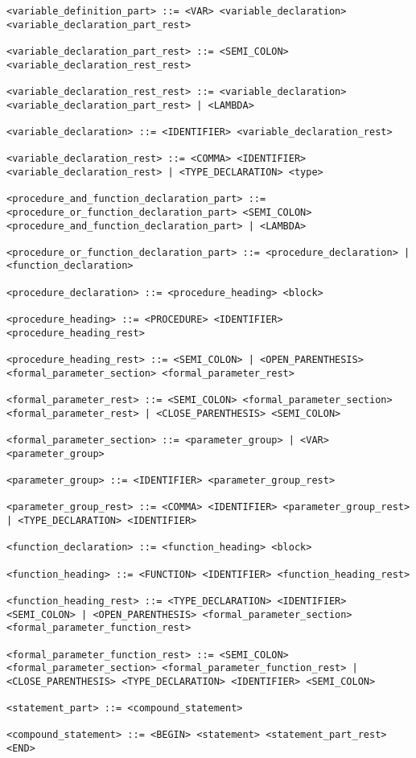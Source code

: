 \documentclass[a4paper,oneside]{report}
\begin{document}
\begin{verbatim}
<variable_definition_part> ::= <VAR> <variable_declaration> <variable_declaration_part_rest>

<variable_declaration_part_rest> ::= <SEMI_COLON> <variable_declaration_rest_rest>

<variable_declaration_rest_rest> ::= <variable_declaration> <variable_declaration_part_rest> | <LAMBDA>

<variable_declaration> ::= <IDENTIFIER> <variable_declaration_rest>

<variable_declaration_rest> ::= <COMMA> <IDENTIFIER> <variable_declaration_rest> | <TYPE_DECLARATION> <type>

<procedure_and_function_declaration_part> ::= <procedure_or_function_declaration_part> <SEMI_COLON> <procedure_and_function_declaration_part> | <LAMBDA>

<procedure_or_function_declaration_part> ::= <procedure_declaration> | <function_declaration>

<procedure_declaration> ::= <procedure_heading> <block>

<procedure_heading> ::= <PROCEDURE> <IDENTIFIER> <procedure_heading_rest>

<procedure_heading_rest> ::= <SEMI_COLON> | <OPEN_PARENTHESIS> <formal_parameter_section> <formal_parameter_rest>

<formal_parameter_rest> ::= <SEMI_COLON> <formal_parameter_section> <formal_parameter_rest> | <CLOSE_PARENTHESIS> <SEMI_COLON>

<formal_parameter_section> ::= <parameter_group> | <VAR> <parameter_group>

<parameter_group> ::= <IDENTIFIER> <parameter_group_rest>

<parameter_group_rest> ::= <COMMA> <IDENTIFIER> <parameter_group_rest> | <TYPE_DECLARATION> <IDENTIFIER>

<function_declaration> ::= <function_heading> <block>

<function_heading> ::= <FUNCTION> <IDENTIFIER> <function_heading_rest>

<function_heading_rest> ::= <TYPE_DECLARATION> <IDENTIFIER> <SEMI_COLON> | <OPEN_PARENTHESIS> <formal_parameter_section> <formal_parameter_function_rest>

<formal_parameter_function_rest> ::= <SEMI_COLON> <formal_parameter_section> <formal_parameter_function_rest> | <CLOSE_PARENTHESIS> <TYPE_DECLARATION> <IDENTIFIER> <SEMI_COLON>

<statement_part> ::= <compound_statement>

<compound_statement> ::= <BEGIN> <statement> <statement_part_rest> <END>


\end{verbatim}
\end{document}
